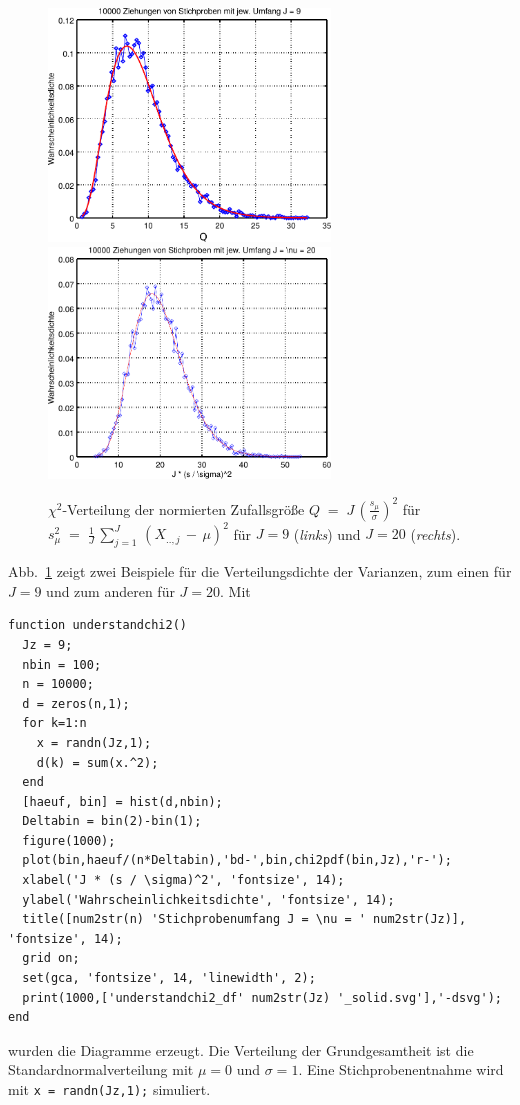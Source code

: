 \begin{figure}
\begin{center}
\includegraphics[width=75mm]{05_vorlesung/media/understandchi2_df9_final.pdf} \hspace{5mm}
\includegraphics[width=75mm]{05_vorlesung/media/understandchi2_df20_final.pdf}
\caption{\label{ch2beispiele}$\chi^2$-Verteilung der normierten
Zufallsgröße $Q \; = \; J \, \left( \frac{s_{\mu}}{\sigma} \right)^2$ für
$s_{\mu}^2 \; = \; \frac{1}{J} \, \sum_{j=1}^{J} \, (X_{..,j} \, - \, \mu)^2$
für $J = 9$  (\textsl{links}) und $J = 20$ (\textsl{rechts}).}
\end{center}
\end{figure}

Abb.~\ref{ch2beispiele} zeigt zwei Beispiele für die Verteilungsdichte der Varianzen, zum einen
für $J = 9$ und zum anderen für $J = 20$. Mit
\begin{lstlisting}
function understandchi2()
  Jz = 9;
  nbin = 100;
  n = 10000;
  d = zeros(n,1);
  for k=1:n
    x = randn(Jz,1);
    d(k) = sum(x.^2);
  end
  [haeuf, bin] = hist(d,nbin);
  Deltabin = bin(2)-bin(1);
  figure(1000);
  plot(bin,haeuf/(n*Deltabin),'bd-',bin,chi2pdf(bin,Jz),'r-');
  xlabel('J * (s / \sigma)^2', 'fontsize', 14);
  ylabel('Wahrscheinlichkeitsdichte', 'fontsize', 14);
  title([num2str(n) 'Stichprobenumfang J = \nu = ' num2str(Jz)], 'fontsize', 14);
  grid on;
  set(gca, 'fontsize', 14, 'linewidth', 2);
  print(1000,['understandchi2_df' num2str(Jz) '_solid.svg'],'-dsvg');
end
\end{lstlisting}
wurden die Diagramme erzeugt. Die Verteilung der Grundgesamtheit ist die
Standardnormalverteilung mit $\mu = 0$ und $\sigma = 1$.
Eine Stichprobenentnahme wird mit \texttt{x = randn(Jz,1);} simuliert.


